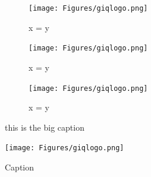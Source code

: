 \begin{figure}
\centering
      \begin{subfigure}[b]{0.3\textwidth}
          \centering
          \texttt{[image: Figures/giqlogo.png]}
          \caption{x = y}
      \end{subfigure}
      \hfill
      \begin{subfigure}[b]{0.3\textwidth}
          \centering
          \texttt{[image: Figures/giqlogo.png]}
          \caption{x = y}
      \end{subfigure}
      \hfill
      \begin{subfigure}[b]{0.3\textwidth}
          \centering
          \texttt{[image: Figures/giqlogo.png]}
          \caption{x = y}
      \end{subfigure}
\caption{this is the big caption}
\end{figure}

\begin{figure}
    \centering
    \texttt{[image: Figures/giqlogo.png]}
    \caption{Caption}
    \label{fig:my_label}
\end{figure}







